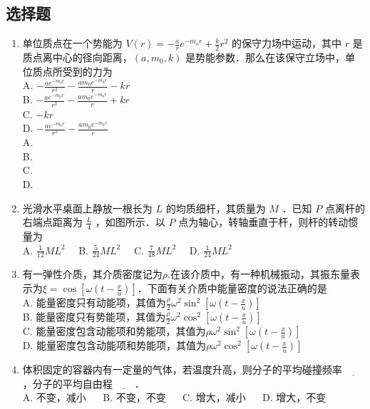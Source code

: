 
\subsection{选择题}
\begin{enumerate}
\item 单位质点在一个势能为 $V(r) = -\frac{a}{r}e^{-m_{o}r}+\frac{k}{2}r^{2}$ 的保守力场中运动，其中 $r$ 是质点离中心的径向距离，$(a,m_{0},k)$ 是势能参数．那么在该保守立场中，单位质点所受到的力为\\
A. $-\frac{ae^{-m_{0}r}}{r^{2}}-\frac{am_{0}e^{-m_{0}r}}{r}-kr$\\
B. $-\frac{ae^{-m_{0}r}}{r^{2}}-\frac{am_{0}e^{-m_{0}r}}{r}+kr$\\
C. $-kr$\\
D. $-\frac{ae^{-m_{0}r}}{r^{2}}-\frac{am_{0}e^{-m_{0}r}}{r}$\\

A. \\
B. \\
C. \\
D. \\

\item 光滑水平桌面上静放一根长为 $L$ 的均质细杆，其质量为 $M$ ．已知 $P$ 点离杆的右端点距离为 $\frac{L}{4}$ ，如图所示．以 $P$ 点为轴心，转轴垂直于杆，则杆的转动惯量为\\
A. $\frac{1}{12}ML^{2} \quad$
B. $\frac{5}{24}ML^{2} \quad$
C. $\frac{7}{48}ML^{2} \quad$
D. $\frac{1}{24}ML^{2} \quad$

\item 有一弹性介质，其介质密度记为$\rho$.在该介质中，有一种机械振动，其振东量表示为$\xi = \cos{[\omega(t-\frac{x}{u})]}$．下面有关介质中能量密度的说法正确的是\\
A. 能量密度只有动能项，其值为$\frac{\rho}{2}\omega^{2}\sin^{2}{[\omega(t-\frac{x}{u})]}$\\
B. 能量密度只有势能项，其值为$\frac{\rho}{2}\omega^{2}\cos^{2}{[\omega(t-\frac{x}{u})]}$\\
C. 能量密度包含动能项和势能项，其值为$\rho\omega^{2}\sin^{2}{[\omega(t-\frac{x}{u})]}$\\
D. 能量密度包含动能项和势能项，其值为$\rho\omega^{2}\cos^{2}{[\omega(t-\frac{x}{u})]}$\\

\item 体积固定的容器内有一定量的气体，若温度升高，则分子的平均碰撞频率$\underline{~~~~~~~~~~}$，分子的平均自由程$\underline{~~~~~~~~~~}$．\\
A. 不变，减小 $\quad$
B. 不变，不变 $\quad$
C. 增大，减小 $\quad$
D. 增大，不变 $\quad$


\end{enumerate}
